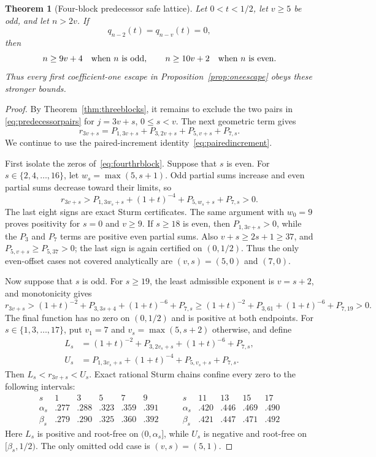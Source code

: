 \documentclass[11pt]{article}
\newtheorem{theorem}{Theorem}[section]
\theoremstyle{remark}
\numberwithin{equation}{section}
\begin{document}
\begin{theorem}[Four-block predecessor safe lattice]
\label{thm:fourblocks}
Let $0<t<1/2$, let $v\ge5$ be odd, and let $n>2v$.  If
\[
 q_{n-2}(t)=q_{n-v}(t)=0,
\]
then
\[
 n\ge9v+4\quad\hbox{when $n$ is odd},\qquad
 n\ge10v+2\quad\hbox{when $n$ is even}.
\]
Thus every first coefficient-one escape in
Proposition~\ref{prop:oneescape} obeys these stronger bounds.
\end{theorem}
\begin{proof}
By Theorem~\ref{thm:threeblocks}, it remains to exclude the two pairs in
\eqref{eq:predecessorpairs} for $j=3v+s$, $0\le s<v$.  The next geometric
term gives
\begin{equation}\label{eq:fourthrblock}
 r_{3v+s}=P_{1,3v+s}+P_{3,2v+s}+P_{5,v+s}+P_{7,s}.
\end{equation}
We continue to use the paired-increment identity~\eqref{eq:pairedincrement}.

First isolate the zeros of~\eqref{eq:fourthrblock}.  Suppose that $s$ is
even.  For $s\in\{2,4,\ldots,16\}$, let $w_s=\max(5,s+1)$.  Odd partial
sums increase and even partial sums decrease toward their limits, so
\[
 r_{3v+s}>
 P_{1,3w_s+s}+(1+t)^{-4}+P_{5,w_s+s}+P_{7,s}>0.
\]
The last eight signs are exact Sturm certificates.  The same argument with
$w_0=9$ proves positivity for $s=0$ and $v\ge9$.  If $s\ge18$ is even, then
$P_{1,3v+s}>0$, while the $P_3$ and $P_7$ terms are positive even partial
sums.  Also $v+s\ge2s+1\ge37$, and
$P_{5,v+s}\ge P_{5,37}>0$; the last sign is again certified on $(0,1/2)$.
Thus the only even-offset cases not covered analytically are $(v,s)=(5,0)$
and $(7,0)$.

Now suppose that $s$ is odd.  For $s\ge19$, the least admissible exponent is
$v=s+2$, and monotonicity gives
\[
 r_{3v+s}>(1+t)^{-2}+P_{3,3s+4}+(1+t)^{-6}+P_{7,s}
 \ge (1+t)^{-2}+P_{3,61}+(1+t)^{-6}+P_{7,19}>0.
\]
The final function has no zero on $(0,1/2)$ and is positive at both
endpoints.  For $s\in\{1,3,\ldots,17\}$, put $v_1=7$ and
$v_s=\max(5,s+2)$ otherwise, and define
\begin{align*}
 L_s&=(1+t)^{-2}+P_{3,2v_s+s}+(1+t)^{-6}+P_{7,s},\\
 U_s&=P_{1,3v_s+s}+(1+t)^{-4}+P_{5,v_s+s}+P_{7,s}.
\end{align*}
Then $L_s<r_{3v+s}<U_s$.  Exact rational Sturm chains confine every zero to
the following intervals:
\[
\begin{array}{c|ccccc}
s&1&3&5&7&9\\ \hline
\alpha_s&.277&.288&.323&.359&.391\\
\beta_s &.279&.290&.325&.360&.392
\end{array}
\qquad
\begin{array}{c|cccc}
s&11&13&15&17\\ \hline
\alpha_s&.420&.446&.469&.490\\
\beta_s &.421&.447&.471&.492
\end{array}
\]
Here $L_s$ is positive and root-free on $(0,\alpha_s]$, while $U_s$ is
negative and root-free on $[\beta_s,1/2)$.  The only omitted odd case is
$(v,s)=(5,1)$.


\end{proof}
\end{document}
